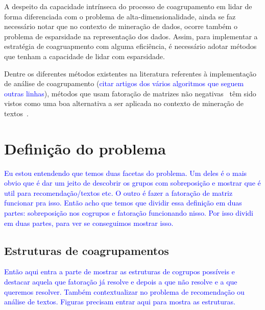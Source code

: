 \documentclass[
    12pt,                %
    oneside,            %
    a4paper,            %
    english,            %
    brazil                %
    ]{abntex2ppgsi}
\begin{document}
A despeito da capacidade intrínseca do processo de coagrupamento em lidar de forma diferenciada com o problema de alta-dimensionalidade, ainda se faz necessário notar que no contexto de mineração de dados, ocorre também o problema de esparsidade na representação dos dados. Assim, para implementar a estratégia de coagruapmento com alguma eficiência, é necessário adotar métodos que tenham a capacidade de lidar com esparsidade.

Dentre os diferentes métodos existentes na literatura referentes à implementação de análise de coagrupamento (\textcolor{blue}{citar artigos dos vários algoritmos que seguem outras linhas}), métodos que usam fatoração de matrizes não negativas~\cite{lee:nnmf00, lee99} têm sido vistos como uma boa alternativa a ser aplicada no contexto de mineração de textos~\cite{Xu2003, Shahnaz2006373, Yoo2010}.


\section{Definição do problema}

\textcolor{blue}{Eu estou entendendo que temos duas facetas do problema. Um deles é o mais obvio que é dar um jeito de descobrir os grupos com sobreposição e mostrar que é util para recomendação/textos etc. O outro é fazer a fatoração de matriz funcionar pra isso. Então acho que temos que dividir essa definição em duas partes: sobreposição nos cogrupos e fatoração funcionando nisso. Por isso dividi em duas partes, para ver se conseguimos mostrar isso.}

\subsection{Estruturas de coagrupamentos}

\textcolor{blue}{Então aqui entra a parte de mostrar as estruturas de cogrupos possíveis e destacar aquela que fatoração já resolve e depois a que não resolve e a que queremos resolver. Também contextualizar no problema de recomendação ou análise de textos. Figuras precisam entrar aqui para mostra as estruturas.}
\end{document}
